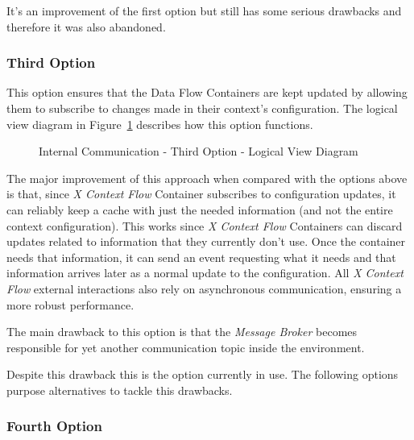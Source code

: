 It's an improvement of the first option but still has some serious drawbacks and therefore it was also abandoned. 

\subsubsection*{Third Option}
\label{subsubsec:design:alternatives:internal:third}

This option ensures that the Data Flow Containers are kept updated by allowing them to subscribe to changes made in their context's configuration. The logical view diagram in Figure~\ref{fig:design:alternatives:internal:third:diagram} describes how this option functions.

\begin{figure}[H]
   \centering
   \resizebox{\columnwidth}{!}
   {
      
   }
   \caption[Internal Communication - Third Option - Logical View Diagram]{Internal Communication - Third Option - Logical View Diagram}
   \label{fig:design:alternatives:internal:third:diagram}
\end{figure}

The major improvement of this approach when compared with the options above is that, since \textit{X Context Flow} Container subscribes to configuration updates, it can reliably keep a cache with just the needed information (and not the entire context configuration). This works since \textit{X Context Flow} Containers can discard updates related to information that they currently don't use. Once the container needs that information, it can send an event requesting what it needs and that information arrives later as a normal update to the configuration. 
All \textit{X Context Flow} external interactions also rely on asynchronous communication, ensuring a more robust performance.

The main drawback to this option is that the \textit{Message Broker} becomes responsible for yet another communication topic inside the environment.

Despite this drawback this is the option currently in use. The following options purpose alternatives to tackle this drawbacks.

\subsubsection*{Fourth Option}
\label{subsubsec:design:alternatives:internal:fourth}

